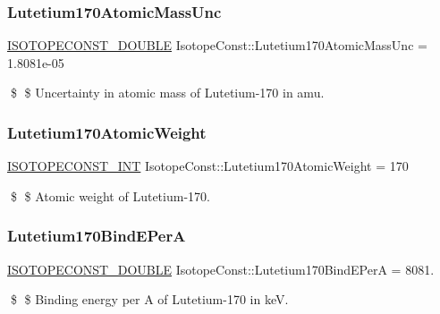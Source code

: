 \subsubsection{\texorpdfstring{Lutetium170\+Atomic\+Mass\+Unc}{Lutetium170AtomicMassUnc}}
{\footnotesize\ttfamily \mbox{\hyperlink{group___isotope_const-_macros_ga8f45a7272ce02c0b4c65c44636ed719a}{I\+S\+O\+T\+O\+P\+E\+C\+O\+N\+S\+T\+\_\+\+D\+O\+U\+B\+LE}} Isotope\+Const\+::\+Lutetium170\+Atomic\+Mass\+Unc = 1.\+8081e-\/05}

\$ \$ Uncertainty in atomic mass of Lutetium-\/170 in amu. \mbox{\label{group___isotope_const-_lutetium-_lu170_ga1789f8434c4cfc4d23647e234592f45b}} 
\subsubsection{\texorpdfstring{Lutetium170\+Atomic\+Weight}{Lutetium170AtomicWeight}}
{\footnotesize\ttfamily \mbox{\hyperlink{group___isotope_const-_macros_ga5f18360b3e99483a35c32d789e62621c}{I\+S\+O\+T\+O\+P\+E\+C\+O\+N\+S\+T\+\_\+\+I\+NT}} Isotope\+Const\+::\+Lutetium170\+Atomic\+Weight = 170}

\$ \$ Atomic weight of Lutetium-\/170. \mbox{\label{group___isotope_const-_lutetium-_lu170_ga73ea1158a61a6e3ead6da6bd27b2f0a6}} 
\subsubsection{\texorpdfstring{Lutetium170\+Bind\+E\+PerA}{Lutetium170BindEPerA}}
{\footnotesize\ttfamily \mbox{\hyperlink{group___isotope_const-_macros_ga8f45a7272ce02c0b4c65c44636ed719a}{I\+S\+O\+T\+O\+P\+E\+C\+O\+N\+S\+T\+\_\+\+D\+O\+U\+B\+LE}} Isotope\+Const\+::\+Lutetium170\+Bind\+E\+PerA = 8081.}

\$ \$ Binding energy per A of Lutetium-\/170 in keV. \mbox{\label{group___isotope_const-_lutetium-_lu170_ga22f15cb403e51f2917f799b31d5b16ff}} 
